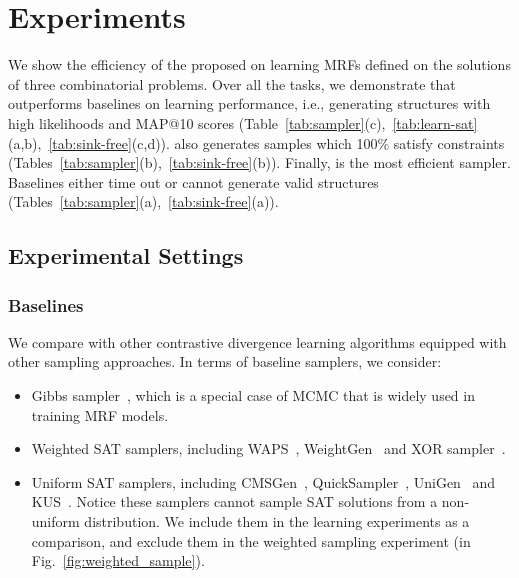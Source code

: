 \section{Experiments}
We show the efficiency of the proposed \nls on learning MRFs defined on the
solutions of three combinatorial problems.
%
Over all the tasks, we demonstrate that \nls outperforms baselines on learning
performance, i.e., generating structures with high likelihoods and MAP@10
scores
(Table~\ref{tab:sampler}(c),~\ref{tab:learn-sat}(a,b),~\ref{tab:sink-free}(c,d)).
\nls also generates samples which 100\% satisfy constraints
(Tables~\ref{tab:sampler}(b),~\ref{tab:sink-free}(b)).%
%
Finally, \nls is the most efficient sampler. Baselines either time out or
cannot generate valid structures
(Tables~\ref{tab:sampler}(a),~\ref{tab:sink-free}(a)).

\subsection{Experimental Settings}
\subsubsection*{Baselines} We compare \nls with other contrastive divergence learning algorithms equipped
with other sampling approaches. In terms of baseline samplers, we consider:
\begin{itemize}[align=left, leftmargin=0pt, labelwidth=0pt, itemindent=!]
    \item Gibbs sampler~\citep{carter1994gibbs}, which is a special case of MCMC that is
          widely used in training MRF models.
    \item Weighted SAT samplers, including WAPS~\citep{DBLP:conf/tacas/GuptaSRM19},
          WeightGen~\citep{DBLP:conf/aaai/ChakrabortyFMSV14} and XOR
          sampler~\citep{DBLP:conf/nips/ErmonGSS13,DBLP:conf/uai/DingX21}.
    \item Uniform SAT samplers, including CMSGen~\citep{DBLP:conf/fmcad/GoliaSCM21},
          QuickSampler~\citep{DBLP:conf/icse/DutraLBS18},
          UniGen~\citep{DBLP:conf/cav/SoosGM20} and
          KUS~\citep{DBLP:conf/lpar/SharmaGRM18}. Notice these samplers cannot sample SAT
          solutions from a non-uniform distribution. We include them in the learning
          experiments as a comparison, and exclude them in the weighted sampling
          experiment (in Fig.~\ref{fig:weighted_sample}).
\end{itemize}

